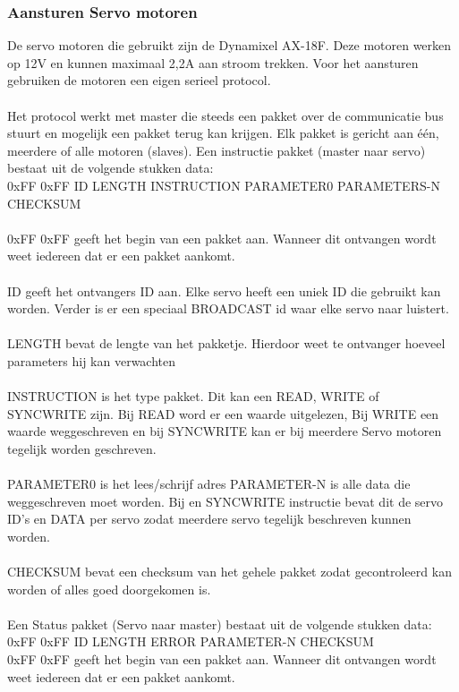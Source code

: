 \documentclass[10pt,a4paper]{article}
\begin{document}
\subsubsection{Aansturen Servo motoren}
De servo motoren die gebruikt zijn de Dynamixel AX-18F. Deze motoren werken op 12V en kunnen maximaal 2,2A aan stroom trekken.
Voor het aansturen gebruiken de motoren een eigen serieel protocol.\\\\
Het protocol werkt met master die steeds een pakket over de communicatie bus stuurt en mogelijk een pakket terug kan krijgen. Elk pakket is gericht aan \'e\'en, meerdere of alle motoren (slaves).
Een instructie pakket (master naar servo) bestaat uit de volgende stukken data:\\
0xFF 0xFF ID LENGTH INSTRUCTION PARAMETER0 PARAMETERS-N CHECKSUM\\\\
0xFF 0xFF geeft het begin van een pakket aan. Wanneer dit ontvangen wordt weet iedereen dat er een pakket aankomt.\\\\
ID geeft het ontvangers ID aan. Elke servo heeft een uniek ID die gebruikt kan worden. Verder is er een speciaal BROADCAST id waar elke servo naar luistert.\\\\
LENGTH bevat de lengte van het pakketje. Hierdoor weet te ontvanger hoeveel parameters hij kan verwachten\\\\
INSTRUCTION is het type pakket. Dit kan een READ, WRITE of SYNCWRITE zijn. Bij READ word er een waarde uitgelezen, Bij WRITE een waarde weggeschreven en bij SYNCWRITE kan er bij meerdere Servo motoren tegelijk worden geschreven.\\\\
PARAMETER0 is het lees/schrijf adres
PARAMETER-N is alle data die weggeschreven moet worden. Bij en SYNCWRITE instructie bevat dit de servo ID's en DATA per servo zodat meerdere servo tegelijk beschreven kunnen worden.\\\\
CHECKSUM bevat een checksum van het gehele pakket zodat gecontroleerd kan worden of alles goed doorgekomen is.\\\\
Een Status pakket (Servo naar master) bestaat uit de volgende stukken data:\\
0xFF 0xFF ID LENGTH ERROR PARAMETER-N CHECKSUM\\
0xFF 0xFF geeft het begin van een pakket aan. Wanneer dit ontvangen wordt weet iedereen dat er een pakket aankomt.\\\\
\end{document}
